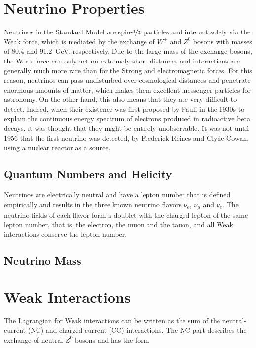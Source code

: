 \section{Neutrino Properties}

Neutrinos in the Standard Model are spin-$\nicefrac{1}{2}$ particles and interact solely via the Weak force, which is mediated by the exchange of $W^{\pm}$ and $Z^0$ bosons with masses of 80.4 and 91.2~GeV, respectively. Due to the large mass of the exchange bosons, the Weak force can only act on extremely short distances and interactions are generally much more rare than for the Strong and electromagnetic forces. For this reason, neutrinos can pass undisturbed over cosmological distances and penetrate enormous amounts of matter, which makes them excellent messenger particles for astronomy. On the other hand, this also means that they are very difficult to detect. Indeed, when their existence was first proposed by Pauli in the 1930s to explain the  continuous energy spectrum of electrons produced in  radioactive beta decays, it was thought that they might be entirely unobservable. It was not until 1956 that the first neutrino was detected, by Frederick Reines and Clyde Cowan, using a nuclear reactor as a source.

\subsection{Quantum Numbers and Helicity}

Neutrinos are electrically neutral and have a lepton number that is defined empirically and results in the three known neutrino flavors $\nu_e$, $\nu_\mu$ and $\nu_e$. The neutrino fields of each flavor form a doublet with the charged lepton of the same lepton number, that is, the electron, the muon and the tauon, and all Weak interactions conserve the lepton number. 


\subsection{Neutrino Mass}

\section{Weak Interactions}
\label{sec:ew-interactions}

The Lagrangian for Weak interactions can be written as the sum of the neutral-current (NC) and charged-current (CC) interactions. The NC part describes the exchange of neutral $Z^0$ bosons and has the form

